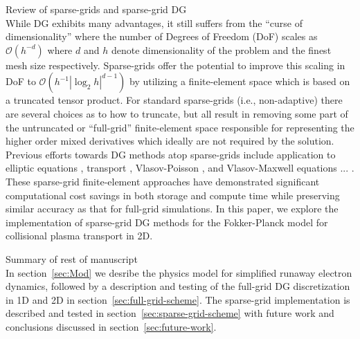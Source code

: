 \documentclass[preprint,11pt]{elsarticle}
\begin{document}
{\tiny\color{red} Review of sparse-grids and sparse-grid DG\\}
While DG exhibits many advantages, it still suffers from the ``curse of dimensionality'' where the number of Degrees of Freedom (DoF) scales as $\mathcal{O}(h^{-d})$ where $d$ and $h$ denote dimensionality of the problem and the finest mesh size respectively. Sparse-grids \cite{Bungartz2004} offer the potential to improve this scaling in DoF to $\mathcal{O}(h^{-1}|\log_2 h|^{d-1})$ by utilizing a finite-element space which is based on a truncated tensor product. For standard sparse-grids (i.e., non-adaptive) there are several choices as to how to truncate, but all result in removing some part of the untruncated or ``full-grid'' finite-element space responsible for representing the higher order mixed derivatives which ideally are not required by the solution. Previous efforts towards DG methods atop sparse-grids include application to elliptic equations \cite{wang2016sparse}, transport \cite{GuoCheng2017}, Vlasov-Poisson \cite{guo2016sparse,guo2017adaptive}, and Vlasov-Maxwell equations \cite{tao2019sparse} ... . These sparse-grid finite-element approaches have demonstrated significant computational cost savings in both storage and compute time while preserving similar accuracy as that for full-grid simulations. In this paper, we explore the implementation of sparse-grid DG methods for the Fokker-Planck model for collisional plasma transport in 2D.

{\tiny\color{red} Summary of rest of manuscript\\}
In section~\ref{sec:Mod} we desribe the physics model for simplified runaway electron dynamics, followed  by a description and testing of the full-grid DG discretization in 1D and 2D in section~\ref{sec:full-grid-scheme}. The sparse-grid implementation is described and tested in section~\ref{sec:sparse-grid-scheme} with future work and conclusions discussed in section~\ref{sec:future-work}.
\end{document}
